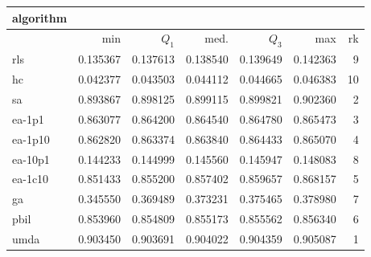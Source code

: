 \begin{tabular}{@{}l*{5}{>{{}}N{1}{3}}>{{}}N{2}{0}@{}}
\toprule
{algorithm} &  \\
\midrule
& {min} & {$Q_1$} & {med.} & {$Q_3$} & {max} & {rk}\\
\midrule
rls & 0.135367 & 0.137613 & 0.138540 & 0.139649 & 0.142363 & 9\\
hc & 0.042377 & 0.043503 & 0.044112 & 0.044665 & 0.046383 & 10\\
sa & 0.893867 & 0.898125 & 0.899115 & 0.899821 & 0.902360 & 2\\
ea-1p1 & 0.863077 & 0.864200 & 0.864540 & 0.864780 & 0.865473 & 3\\
ea-1p10 & 0.862820 & 0.863374 & 0.863840 & 0.864433 & 0.865070 & 4\\
ea-10p1 & 0.144233 & 0.144999 & 0.145560 & 0.145947 & 0.148083 & 8\\
ea-1c10 & 0.851433 & 0.855200 & 0.857402 & 0.859657 & 0.868157 & 5\\
ga & 0.345550 & 0.369489 & 0.373231 & 0.375465 & 0.378980 & 7\\
pbil & 0.853960 & 0.854809 & 0.855173 & 0.855562 & 0.856340 & 6\\
umda & {\color{blue}} 0.903450 & {\color{blue}} 0.903691 & {\color{blue}} 0.904022 & {\color{blue}} 0.904359 & {\color{blue}} 0.905087 & 1\\
\bottomrule
\end{tabular}
